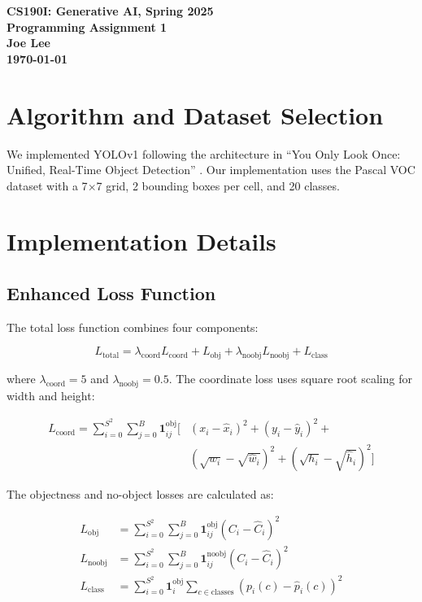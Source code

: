 \documentclass[conference]{IEEEtran}
\renewcommand{\maketitle}{%
  \begin{center}
    {\bfseries\large CS190I: Generative AI, Spring 2025\\
    Programming Assignment 1\\
    \normalsize Joe Lee\\
    \today}
  \end{center}
}
\begin{document}
\maketitle

\section{Algorithm and Dataset Selection}
We implemented YOLOv1 following the architecture in ``You Only Look Once: Unified, Real-Time Object Detection'' \cite{redmon2016you}. Our implementation uses the Pascal VOC dataset with a 7$\times$7 grid, 2 bounding boxes per cell, and 20 classes.

\section{Implementation Details}

\subsection{Enhanced Loss Function}
The total loss function combines four components:

\begin{equation}
L_{\text{total}} = \lambda_{\text{coord}}L_{\text{coord}} + L_{\text{obj}} + \lambda_{\text{noobj}}L_{\text{noobj}} + L_{\text{class}}
\end{equation}

where $\lambda_{\text{coord}} = 5$ and $\lambda_{\text{noobj}} = 0.5$. The coordinate loss uses square root scaling for width and height:

\begin{equation}
\begin{aligned}
L_{\text{coord}} = \sum_{i=0}^{S^2} \sum_{j=0}^{B} \mathbf{1}_{ij}^{\text{obj}} [&(x_i - \hat{x}_i)^2 + (y_i - \hat{y}_i)^2 + \\
&(\sqrt{w_i} - \sqrt{\hat{w}_i})^2 + (\sqrt{h_i} - \sqrt{\hat{h}_i})^2]
\end{aligned}
\end{equation}

The objectness and no-object losses are calculated as:

\begin{equation}
\begin{aligned}
L_{\text{obj}} &= \sum_{i=0}^{S^2} \sum_{j=0}^{B} \mathbf{1}_{ij}^{\text{obj}} (C_i - \hat{C}_i)^2 \\
L_{\text{noobj}} &= \sum_{i=0}^{S^2} \sum_{j=0}^{B} \mathbf{1}_{ij}^{\text{noobj}} (C_i - \hat{C}_i)^2 \\
L_{\text{class}} &= \sum_{i=0}^{S^2} \mathbf{1}_{i}^{\text{obj}} \sum_{c \in \text{classes}} (p_i(c) - \hat{p}_i(c))^2
\end{aligned}
\end{equation}
\end{document}
